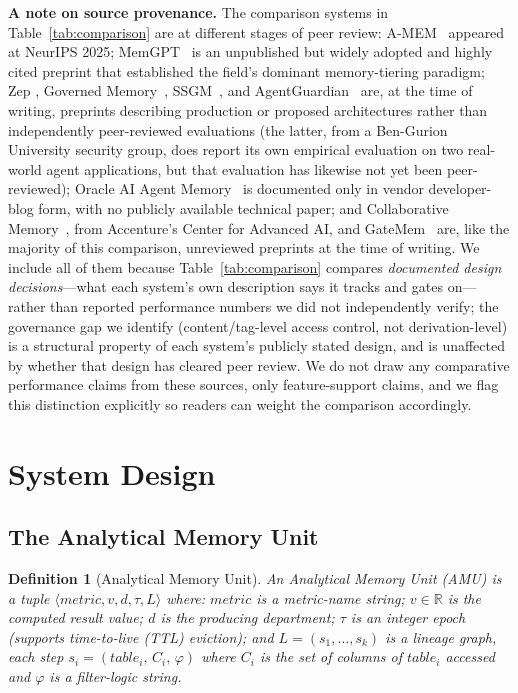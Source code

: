 \documentclass[nolineno]{ieeeaccess}
\newtheorem{definition}{Definition}
\begin{document}
\textbf{A note on source provenance.} The comparison systems in
Table~\ref{tab:comparison} are at different stages of peer review:
A-MEM~\cite{xu2025amem} appeared at NeurIPS 2025; MemGPT~\cite{packer2023memgpt}
is an unpublished but widely adopted and highly cited preprint that
established the field's dominant memory-tiering paradigm; Zep
\cite{rasmussen2025zep}, Governed Memory~\cite{taheri2026governed},
SSGM~\cite{lam2026ssgm}, and AgentGuardian~\cite{abaev2026agentguardian} are,
at the time of writing, preprints describing production or proposed
architectures rather than independently peer-reviewed evaluations (the
latter, from a Ben-Gurion University security group, does report its own
empirical evaluation on two real-world agent applications, but that
evaluation has likewise not yet been peer-reviewed); Oracle AI Agent
Memory~\cite{oracle2026memory} is documented only in vendor developer-blog
form, with no publicly available technical paper; and Collaborative
Memory~\cite{rezazadeh2025collabmem}, from Accenture's Center for Advanced
AI, and GateMem~\cite{ren2026gatemem} are, like the majority of this
comparison, unreviewed preprints at the time of writing. We include all of them
because Table~\ref{tab:comparison} compares
\emph{documented design decisions}---what each system's own description says
it tracks and gates on---rather than reported performance numbers we did not
independently verify; the governance gap we identify (content/tag-level
access control, not derivation-level) is a structural property of each
system's publicly stated design, and is unaffected by whether that design
has cleared peer review. We do not draw any comparative performance claims
from these sources, only feature-support claims, and we flag this
distinction explicitly so readers can weight the comparison accordingly.



\section{System Design}
\label{sec:design}

\subsection{The Analytical Memory Unit}

\begin{definition}[Analytical Memory Unit]
An \emph{Analytical Memory Unit} (AMU) is a tuple
$\langle \mathit{metric}, v, d, \tau, L \rangle$ where:
$\mathit{metric}$ is a metric-name string;
$v \in \mathbb{R}$ is the computed result value;
$d$ is the producing department;
$\tau$ is an integer epoch (supports time-to-live (TTL) eviction); and
$L = (s_1, \ldots, s_k)$ is a \emph{lineage graph}, each step
$s_i = (\mathit{table}_i,\, C_i,\, \varphi)$
where $C_i$ is the set of columns of $\mathit{table}_i$ accessed and
$\varphi$ is a filter-logic string.
\end{definition}
\end{document}
